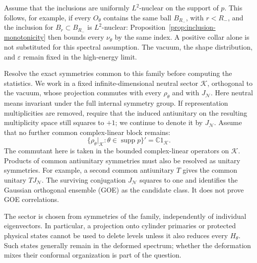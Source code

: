 \documentclass[a4paper,11pt]{article}
\theoremstyle{definition}
\begin{document}
Assume that the inclusions are uniformly $L^2$-nuclear on the support of $p$. This follows, for example, if every $O_\theta$ contains the same ball $B_{R_-}$, with $r<R_-$, and the inclusion for $B_r\subset B_{R_-}$ is $L^2$-nuclear: Proposition~\ref{prop:inclusion-monotonicity} then bounds every $\nu_\theta$ by the same index. A positive collar alone is not substituted for this spectral assumption. The vacuum, the shape distribution, and $\varepsilon$ remain fixed in the high-energy limit.

Resolve the exact symmetries common to this family before computing the statistics. We work in a fixed infinite-dimensional neutral sector $\mathcal K$, orthogonal to the vacuum, whose projection commutes with every $\rho_\theta$ and with $J_{\mathcal N}$. Here neutral means invariant under the full internal symmetry group. If representation multiplicities are removed, require that the induced antiunitary on the resulting multiplicity space still squares to $+1$; we continue to denote it by $J_{\mathcal N}$. Assume that no further common complex-linear block remains:
\begin{equation}
 \bigl\{\rho_\theta|_{\mathcal K}:\theta\in\operatorname{supp}p\bigr\}'
   =\mathbb C1_{\mathcal K}.
 \label{eq:inclusion-common-sector}
\end{equation}
The commutant here is taken in the bounded complex-linear operators on $\mathcal K$. Products of common antiunitary symmetries must also be resolved as unitary symmetries. For example, a second common antiunitary $T$ gives the common unitary $TJ_{\mathcal N}$. The surviving conjugation $J_{\mathcal N}$ squares to one and identifies the Gaussian orthogonal ensemble (GOE) as the candidate class. It does not prove GOE correlations.

The sector is chosen from symmetries of the family, independently of individual eigenvectors. In particular, a projection onto cylinder primaries or protected physical states cannot be used to delete levels unless it also reduces every $H_\theta$. Such states generally remain in the deformed spectrum; whether the deformation mixes their conformal organization is part of the question.
\end{document}
